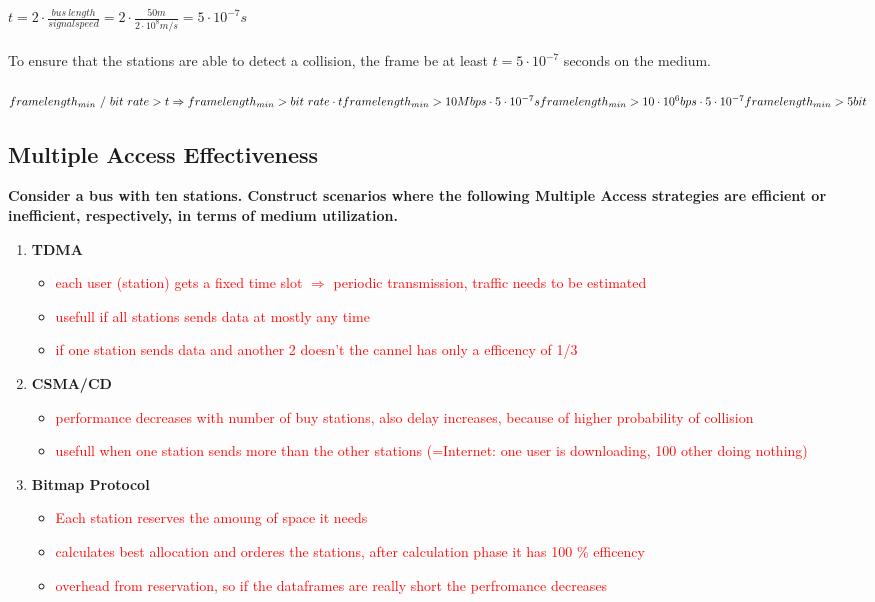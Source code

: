 \documentclass[a4paper,12pt]{article}
\begin{document}
	$t = 2 \cdot \frac{bus~length}{signal speed} = 2 \cdot \frac{50 m}{2 \cdot 10^8 m/s} = 5 \cdot 10^{-7} s$ \\
	\\
	To ensure that the stations are able to detect a collision, the frame be at least $t = 5 \cdot 10^{-7}$ seconds on the medium.\\
	\\
	$frame length_{min} ~/~ bit~rate > t \Rightarrow frame length_{min} > bit~rate \cdot t\\
	frame length_{min} > 10Mbps \cdot 5 \cdot 10^{-7}s \\
	frame length_{min} > 10 \cdot 10^6 bps \cdot 5 \cdot 10^{-7} \\
	frame length_{min} > 5 bit $
	
	\subsection{Multiple Access Effectiveness}
	\textbf{Consider a bus with ten stations. Construct scenarios where the following Multiple Access strategies are efficient or inefficient, respectively, in terms of medium utilization.}
		\begin{enumerate}[label=(\roman*),itemsep=0pt]
		\item \textbf{TDMA}
		\begin{itemize}[itemsep=0pt]
			\item \textcolor{red}{each user (station) gets a fixed time slot $\Rightarrow$ periodic transmission, traffic needs to be estimated}
			\item \textcolor{red}{usefull if all stations sends data at mostly any time}
			\item \textcolor{red}{if one station sends data and another 2 doesn't the cannel has only a efficency of 1/3}
		\end{itemize}
		\item \textbf{CSMA/CD}
		\begin{itemize}[itemsep=0pt]
			\item \textcolor{red}{performance decreases with number of buy stations, also delay increases, because of higher probability of collision}
			\item \textcolor{red}{usefull when one station sends more than the other stations (=Internet: one user is downloading, 100 other doing nothing)}
		\end{itemize}
		\item \textbf{Bitmap Protocol}
		\begin{itemize}[itemsep=0pt]
			\item \textcolor{red}{Each station reserves the amoung of space it needs}
			\item \textcolor{red}{calculates best allocation and orderes the stations, after calculation phase it has 100 \% efficency}
			\item \textcolor{red}{overhead from reservation, so if the dataframes are really short the perfromance decreases}
		\end{itemize}
	\end{enumerate}
	
\end{document}
